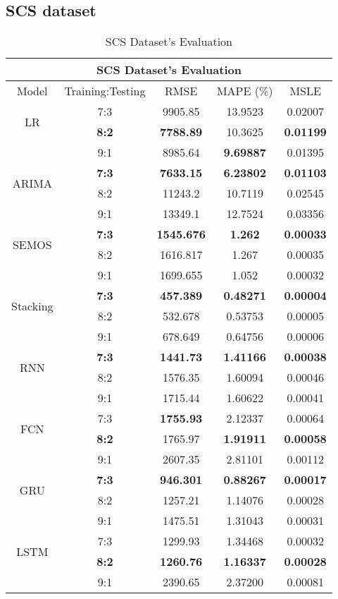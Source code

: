 \documentclass{ieeeojies}
\begin{document}
\subsection{SCS dataset} 
\begin{table}[H]
    \centering
    \begin{tabular}{|c|c|c|c|c|}
         \hline
         \multicolumn{5}{|c|}{\textbf{SCS Dataset's Evaluation}}\\
         \hline
         \centering Model & Training:Testing & RMSE & MAPE (\%) & MSLE\\
         \hline
         \multirow{2}{*}{LR} & 7:3 & 9905.85 & 13.9523 & 0.02007 \\ & \textbf{8:2} & \textbf{7788.89} & 10.3625 & \textbf{0.01199} \\ & 9:1 & 8985.64 & \textbf{9.69887} & 0.01395\\
         \hline
         \multirow{2}{*}{ARIMA} & \textbf{7:3}&\textbf{7633.15}&\textbf{6.23802}&\textbf{0.01103}\\ & 8:2&11243.2&10.7119&0.02545 \\ & 9:1 &  13349.1 & 12.7524& 0.03356\\
         \hline
         \multirow{2}{*}{SEMOS} & \textbf{7:3}	& \textbf{1545.676} & \textbf{1.262} & \textbf{0.00033} \\ & 8:2 & 1616.817 & 1.267 & 0.00035 \\ & 9:1 & 1699.655  & 1.052 & 0.00032\\
         \hline
         \multirow{2}{*}{Stacking} & \textbf{7:3} &  \textbf{457.389} &  \textbf{0.48271} & \textbf{0.00004} \\ & 8:2 &  532.678 & 0.53753 &  0.00005 \\ & 9:1 & 678.649 & 0.64756 & 0.00006\\
         \hline
         \multirow{2}{*}{RNN} & \textbf{7:3} &  \textbf{1441.73} &  \textbf{1.41166} & \textbf{0.00038} \\ & 8:2 &  1576.35 & 1.60094 &  0.00046 \\ & 9:1 & 1715.44 & 1.60622 & 0.00041\\
         \hline
         \multirow{2}{*}{FCN} & 7:3 & \textbf{1755.93} & 2.12337 & 0.00064 \\ & \textbf{8:2} &	1765.97 & \textbf{1.91911} & \textbf{0.00058} \\ & 9:1 & 2607.35	& 2.81101 & 0.00112\\
         \hline
         \multirow{2}{*}{GRU} & \textbf{7:3} & \textbf{946.301} & \textbf{0.88267} & \textbf{0.00017} \\ & 8:2 & 1257.21 & 1.14076 & 0.00028 \\ & 9:1 & 1475.51 &	1.31043 & 0.00031 \\
         \hline
         \multirow{2}{*}{LSTM} & 7:3 & 1299.93 &  1.34468 &  0.00032 \\ & \textbf{8:2} & \textbf{1260.76} &  \textbf{1.16337} &  \textbf{0.00028} \\ & 9:1 & 2390.65 & 2.37200 & 0.00081\\
         \hline
    \end{tabular}
    \caption{SCS Dataset's Evaluation}
    \label{vcbresult}
\end{table}
\end{document}
